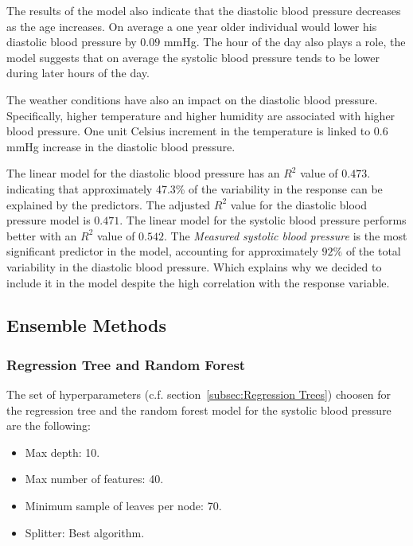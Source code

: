 \documentclass[12 pt]{scrartcl}
\numberwithin{equation}{section}
\begin{document}
The results of the model also indicate that the diastolic blood pressure 
decreases as the age increases. 
On average a one year older individual would lower his diastolic blood pressure by $0.09$ mmHg.
The hour of the day also plays a role,
the model suggests that on average the systolic blood pressure tends to be lower during later hours of the day. 

The weather conditions have also an impact on the diastolic blood pressure.
Specifically, higher temperature and higher humidity are associated with higher blood pressure.
One unit Celsius increment in the temperature is linked to $0.6$ mmHg increase in the diastolic blood pressure.

The linear model for the diastolic blood pressure has an $R^2$ value of $0.473$.
indicating that approximately 47.3\% of the variability in the response can be explained by the predictors. 
The adjusted $R^2$ value for the diastolic blood pressure model
is $0.471$. The linear model for the systolic blood pressure performs better with an $R^2$ value of $0.542$.
The \textit{Measured systolic blood pressure} is the most significant predictor in the model,
accounting for approximately $92\%$ of the total variability in the diastolic blood pressure.
Which explains why we decided to include it in the model despite the high correlation with the response variable.

\subsection{Ensemble Methods}
\label{subsec:Ensemble Methods}

\subsubsection*{Regression Tree and Random Forest}
\label{subsec:Regression Trees}

The set of hyperparameters (c.f. section~\ref{subsec:Regression Trees}) choosen for the regression tree and the random forest model for
the systolic blood pressure are the following:

\begin{itemize}
    \item Max depth: 10.
    \item Max number of features: 40.
    \item Minimum sample of leaves per node: 70.
    \item Splitter: Best algorithm.
\end{itemize} 
\end{document}
